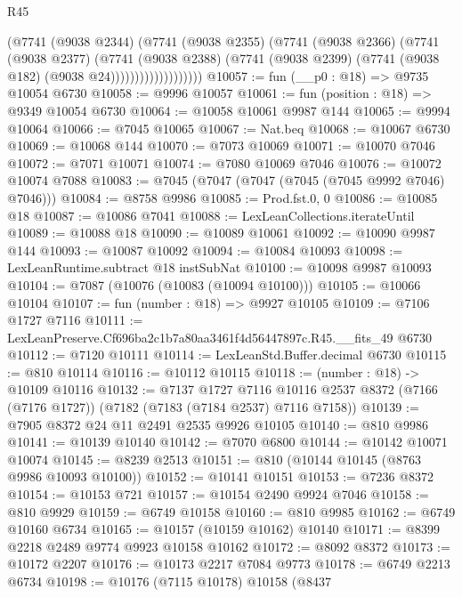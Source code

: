 \begin{lexlean}{R45}
\begin{coremodule}
{                          (@7741
                            (@9038 @2344)
                            (@7741
                              (@9038 @2355)
                              (@7741
                                (@9038 @2366)
                                (@7741
                                  (@9038 @2377)
                                  (@7741
                                    (@9038 @2388)
                                    (@7741
                                      (@9038 @2399)
                                      (@7741 (@9038 @182) (@9038 @24)))))))))))))))))))
@10057 := fun (__p0 : @18) => @9735 @10054 @6730
@10058 := @9996 @10057
@10061 := fun (position : @18) => @9349 @10054 @6730
@10064 := @10058 @10061 @9987 @144
@10065 := @9994 @10064
@10066 := @7045 @10065
@10067 := Nat.beq
@10068 := @10067 @6730
@10069 := @10068 @144
@10070 := @7073 @10069
@10071 := @10070 @7046
@10072 := @7071 @10071
@10074 := @7080 @10069 @7046
@10076 := @10072 @10074 @7088
@10083 := @7045 (@7047 (@7047 (@7045 (@7045 @9992 @7046) @7046)))
@10084 := @8758 @9986
@10085 := Prod.fst.{0, 0}
@10086 := @10085 @18
@10087 := @10086 @7041
@10088 := LexLeanCollections.iterateUntil
@10089 := @10088 @18
@10090 := @10089 @10061
@10092 := @10090 @9987 @144
@10093 := @10087 @10092
@10094 := @10084 @10093
@10098 := LexLeanRuntime.subtract @18 instSubNat
@10100 := @10098 @9987 @10093
@10104 := @7087 (@10076 (@10083 (@10094 @10100)))
@10105 := @10066 @10104
@10107 := fun (number : @18) => @9927 @10105
@10109 := @7106 @1727 @7116
@10111 := LexLeanPreserve.Cf696ba2c1b7a80aa3461f4d56447897c.R45.__fits_49 @6730
@10112 := @7120 @10111
@10114 := LexLeanStd.Buffer.decimal @6730
@10115 := @810 @10114
@10116 := @10112 @10115
@10118 := (number : @18) -> @10109 @10116
@10132 := @7137
    @1727
    @7116
    @10116
    @2537
    @8372
    (@7166 (@7176 @1727))
    (@7182 (@7183 (@7184 @2537) @7116 @7158))
@10139 := @7905 @8372 @24 @11 @2491 @2535 @9926 @10105
@10140 := @810 @9986
@10141 := @10139 @10140
@10142 := @7070 @6800
@10144 := @10142 @10071 @10074
@10145 := @8239 @2513
@10151 := @810 (@10144 @10145 (@8763 @9986 @10093 @10100))
@10152 := @10141 @10151
@10153 := @7236 @8372
@10154 := @10153 @721
@10157 := @10154 @2490 @9924 @7046
@10158 := @810 @9929
@10159 := @6749 @10158
@10160 := @810 @9985
@10162 := @6749 @10160 @6734
@10165 := @10157 (@10159 @10162) @10140
@10171 := @8399 @2218 @2489 @9774 @9923 @10158 @10162
@10172 := @8092 @8372
@10173 := @10172 @2207
@10176 := @10173 @2217 @7084 @9773
@10178 := @6749 @2213 @6734
@10198 := @10176
    (@7115 @10178)
    @10158
    (@8437
}
\end{coremodule}
\end{lexlean}
